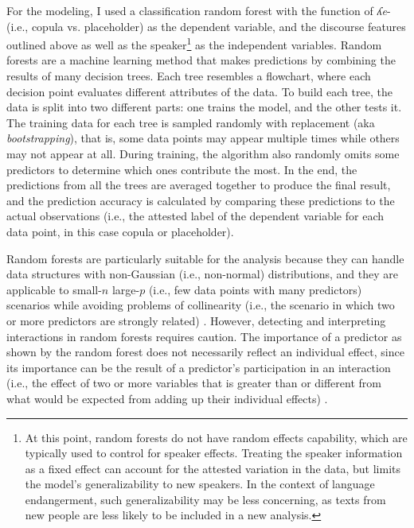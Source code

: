 \documentclass[output=paper,colorlinks,citecolor=brown
\ChapterDOI{10.5281/zenodo.15697581}
]{langscibook}
\begin{document}
For the modeling, I used a classification random forest \citep{Breiman2001} with the function of \textit{ʎe}- (i.e., copula vs. placeholder) as the dependent variable, and the discourse features outlined above as well as the speaker\footnote{At this point, random forests do not have random effects capability, which are typically used to control for speaker effects. Treating the speaker information as a fixed effect can account for the attested variation in the data, but limits the model's generalizability to new speakers. In the context of language endangerment, such generalizability may be less concerning, as texts from new people are less likely to be included in a new analysis.} as the independent variables.
Random forests are a machine learning method that makes predictions by combining the results of many decision trees.
Each tree resembles a flowchart, where each decision point evaluates different attributes of the data. 
To build each tree, the data is split into two different parts: one trains the model, and the other tests it. 
The training data for each tree is sampled randomly with replacement (aka \textit{bootstrapping}), that is, some data points may appear multiple times while others may not appear at all. 
During training, the algorithm also randomly omits some predictors to determine which ones contribute the most. 
In the end, the predictions from all the trees are averaged together to produce the final result, and the prediction accuracy is calculated by comparing these predictions to the actual observations (i.e., the attested label of the dependent variable for each data point, in this case copula or placeholder).

Random forests are particularly suitable for the analysis because they can handle data structures with non-Gaussian (i.e., non-normal) distributions, and they are applicable to small-$n$ large-$p$ (i.e., few data points with many predictors) scenarios while avoiding problems of collinearity (i.e., the scenario in which two or more predictors are strongly related) \citep{Gries2021}.
However, detecting and interpreting interactions in random forests requires caution. 
The importance of a predictor as shown by the random forest does not necessarily reflect an individual effect, since its importance can be the result of a predictor’s participation in an interaction (i.e., the effect of two or more variables that is greater than or different from what would be expected from adding up their individual effects) \citep{Gries2021}. 
\end{document}
